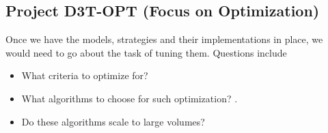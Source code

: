 \subsection*{Project D3T-OPT (Focus on Optimization)}
Once we have the models, strategies and their implementations in place, we would need to go about the task of tuning them.
Questions include
\begin{itemize}
\item What criteria to optimize for?
\item What algorithms to choose for such optimization? \cite{ota_scalable_2015,hame_demand-responsive_2013,NET:NET21600}.
\item Do these algorithms scale to large volumes?
\end{itemize}
